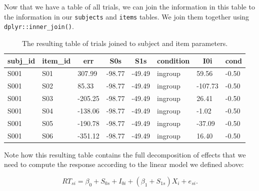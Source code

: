 \documentclass[man,floatsintext]{apa6}
\newenvironment{Shaded}{\begin{snugshade}}{\end{snugshade}}
\newcommand{\KeywordTok}[1]{\textcolor[rgb]{0.13,0.29,0.53}{\textbf{#1}}}
\newcommand{\StringTok}[1]{\textcolor[rgb]{0.31,0.60,0.02}{#1}}
\newcommand{\OperatorTok}[1]{\textcolor[rgb]{0.81,0.36,0.00}{\textbf{#1}}}
\newcommand{\NormalTok}[1]{#1}
\begin{document}
Now that we have a table of all trials, we can join the information in
this table to the information in our \texttt{subjects} and
\texttt{items} tables. We join them together using
\texttt{dplyr::inner\_join()}.

\begin{Shaded}
\end{Shaded}

\begin{table}[tbp]
\begin{center}
\begin{threeparttable}
\caption{\label{tab:joined-table}The resulting table of trials joined to subject and item parameters.}
\begin{tabular}{llllllll}
\toprule
subj\_id & \multicolumn{1}{c}{item\_id} & \multicolumn{1}{c}{err} & \multicolumn{1}{c}{S0s} & \multicolumn{1}{c}{S1s} & \multicolumn{1}{c}{condition} & \multicolumn{1}{c}{I0i} & \multicolumn{1}{c}{cond}\\
\midrule
S001 & S01 & 307.99 & -98.77 & -49.49 & ingroup & 59.56 & -0.50\\
S001 & S02 & 85.33 & -98.77 & -49.49 & ingroup & -107.73 & -0.50\\
S001 & S03 & -205.25 & -98.77 & -49.49 & ingroup & 26.41 & -0.50\\
S001 & S04 & -138.06 & -98.77 & -49.49 & ingroup & -1.02 & -0.50\\
S001 & S05 & -190.78 & -98.77 & -49.49 & ingroup & -37.09 & -0.50\\
S001 & S06 & -351.12 & -98.77 & -49.49 & ingroup & 16.40 & -0.50\\
\bottomrule
\end{tabular}
\end{threeparttable}
\end{center}
\end{table}

Note how this resulting table contains the full decomposition of effects
that we need to compute the response according to the linear model we
defined above:

\[RT_{si} = \beta_0 + S_{0s} + I_{0i} + \left(\beta_1 + S_{1s}\right) X_i + e_{si}.\]
\end{document}
